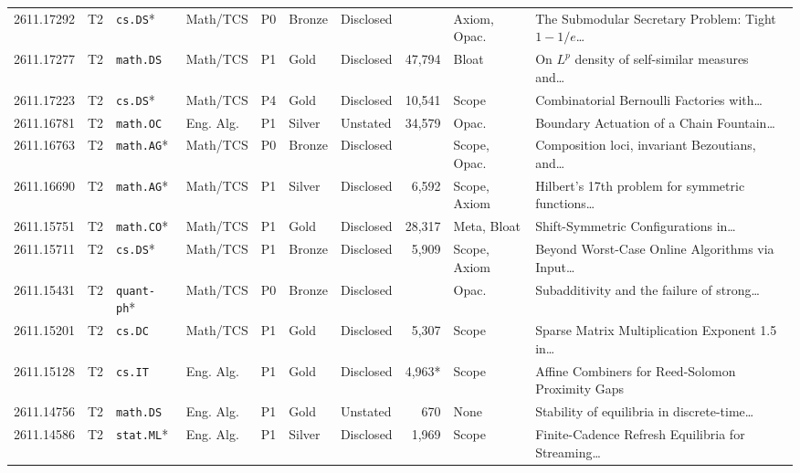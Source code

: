 \documentclass[11pt,letterpaper]{article}
\begin{document}
\begin{longtable}{lllllllrl>{\raggedright\arraybackslash}p{4.05cm}}
2611.17292 & T2 & \texttt{cs.DS}* & Math/TCS & P0 & Bronze & Disclosed & \textemdash{} & Axiom, Opac. & The Submodular Secretary Problem: Tight $1-1/e$\dots~\cite{arxiv2611_17292} \\
2611.17277 & T2 & \texttt{math.DS} & Math/TCS & P1 & Gold & Disclosed & 47,794 & Bloat & On $L^p$ density of self-similar measures and\dots~\cite{arxiv2611_17277} \\
2611.17223 & T2 & \texttt{cs.DS}* & Math/TCS & P4 & Gold & Disclosed & 10,541 & Scope & Combinatorial Bernoulli Factories with\dots~\cite{arxiv2611_17223} \\
2611.16781 & T2 & \texttt{math.OC} & Eng. Alg. & P1 & Silver & Unstated & 34,579 & Opac. & Boundary Actuation of a Chain Fountain\dots~\cite{arxiv2611_16781} \\
2611.16763 & T2 & \texttt{math.AG}* & Math/TCS & P0 & Bronze & Disclosed & \textemdash{} & Scope, Opac. & Composition loci, invariant Bezoutians, and\dots~\cite{arxiv2611_16763} \\
2611.16690 & T2 & \texttt{math.AG}* & Math/TCS & P1 & Silver & Disclosed & 6,592 & Scope, Axiom & Hilbert's 17th problem for symmetric functions\dots~\cite{arxiv2611_16690} \\
2611.15751 & T2 & \texttt{math.CO}* & Math/TCS & P1 & Gold & Disclosed & 28,317 & Meta, Bloat & Shift-Symmetric Configurations in\dots~\cite{arxiv2611_15751} \\
2611.15711 & T2 & \texttt{cs.DS}* & Math/TCS & P1 & Bronze & Disclosed & 5,909 & Scope, Axiom & Beyond Worst-Case Online Algorithms via Input\dots~\cite{arxiv2611_15711} \\
2611.15431 & T2 & \texttt{quant-ph}* & Math/TCS & P0 & Bronze & Disclosed & \textemdash{} & Opac. & Subadditivity and the failure of strong\dots~\cite{arxiv2611_15431} \\
2611.15201 & T2 & \texttt{cs.DC} & Math/TCS & P1 & Gold & Disclosed & 5,307 & Scope & Sparse Matrix Multiplication Exponent 1.5 in\dots~\cite{arxiv2611_15201} \\
2611.15128 & T2 & \texttt{cs.IT} & Eng. Alg. & P1 & Gold & Disclosed & 4,963* & Scope & Affine Combiners for Reed-Solomon Proximity Gaps~\cite{arxiv2611_15128} \\
2611.14756 & T2 & \texttt{math.DS} & Eng. Alg. & P1 & Gold & Unstated & 670 & None & Stability of equilibria in discrete-time\dots~\cite{arxiv2611_14756} \\
2611.14586 & T2 & \texttt{stat.ML}* & Eng. Alg. & P1 & Silver & Disclosed & 1,969 & Scope & Finite-Cadence Refresh Equilibria for Streaming\dots~\cite{arxiv2611_14586} \\

\end{longtable}
\end{document}
